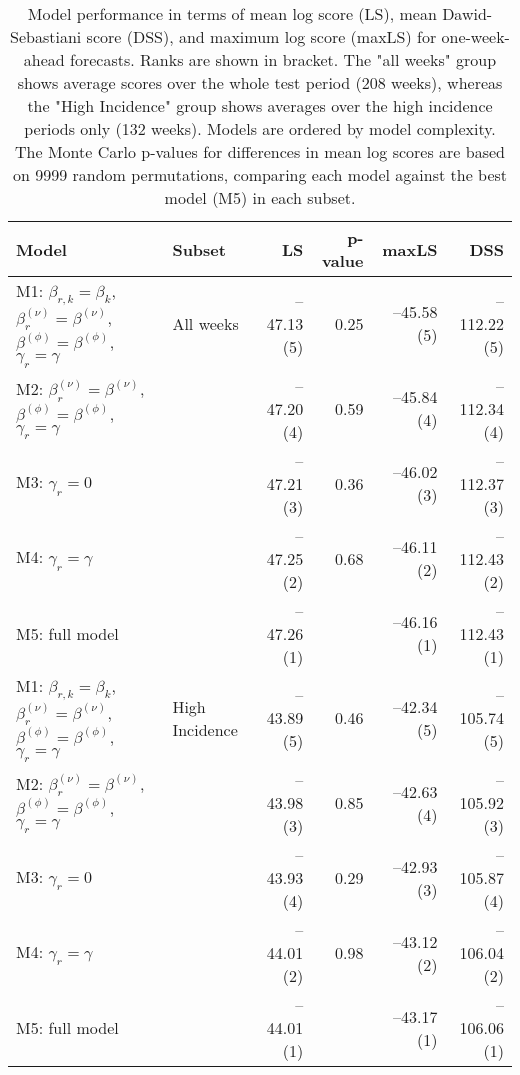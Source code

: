 \begin{table}[ht]
\centering
\begingroup\fontsize{9pt}{10pt}\selectfont
\begin{tabular}{ll|rrrr}
  \hline
Model & Subset & LS & p-value & maxLS & DSS \\ 
  \hline
M1: $\beta_{r,k} = \beta_{k}$, $\beta_{r}^{(\nu)} = \beta^{(\nu)}$, $\beta^{(\phi)} = \beta^{(\phi)}$, $\gamma_r = \gamma$ & All weeks & --47.13 (5) & 0.25 & --45.58 (5) & --112.22 (5) \\ 
  M2: $\beta_{r}^{(\nu)} = \beta^{(\nu)}$, $\beta^{(\phi)} = \beta^{(\phi)}$, $\gamma_r = \gamma$ &  & --47.20 (4) & 0.59 & --45.84 (4) & --112.34 (4) \\ 
  M3: $\gamma_r = 0$ &  & --47.21 (3) & 0.36 & --46.02 (3) & --112.37 (3) \\ 
  M4: $\gamma_r = \gamma$ &  & --47.25 (2) & 0.68 & --46.11 (2) & --112.43 (2) \\ 
  M5: full model &  & --47.26 (1) &  & --46.16 (1) & --112.43 (1) \\ 
   \hline
M1: $\beta_{r,k} = \beta_{k}$, $\beta_{r}^{(\nu)} = \beta^{(\nu)}$, $\beta^{(\phi)} = \beta^{(\phi)}$, $\gamma_r = \gamma$ & High Incidence & --43.89 (5) & 0.46 & --42.34 (5) & --105.74 (5) \\ 
  M2: $\beta_{r}^{(\nu)} = \beta^{(\nu)}$, $\beta^{(\phi)} = \beta^{(\phi)}$, $\gamma_r = \gamma$ &  & --43.98 (3) & 0.85 & --42.63 (4) & --105.92 (3) \\ 
  M3: $\gamma_r = 0$ &  & --43.93 (4) & 0.29 & --42.93 (3) & --105.87 (4) \\ 
  M4: $\gamma_r = \gamma$ &  & --44.01 (2) & 0.98 & --43.12 (2) & --106.04 (2) \\ 
  M5: full model &  & --44.01 (1) &  & --43.17 (1) & --106.06 (1) \\ 
   \hline
\end{tabular}
\endgroup
\caption{Model performance in terms of mean log score (LS),
             mean Dawid-Sebastiani score (DSS), and maximum log score (maxLS)
             for one-week-ahead forecasts.
             Ranks are shown in bracket.
             The "all weeks" group shows average scores over the
             whole test period (208 weeks),
             whereas the "High Incidence" group shows
             averages over the high incidence periods only (132 weeks).
             Models are ordered by model complexity.
             The Monte Carlo p-values for differences in mean log scores
             are based on 9999 random permutations,
             comparing each model against the best model (M5) in each subset.} 
\label{tab:forecast}
\end{table}
